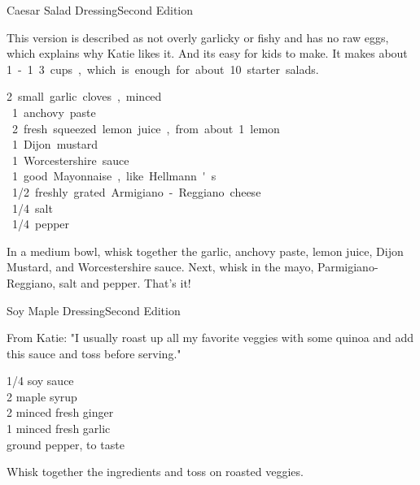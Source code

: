\begin{entry}{Caesar Salad Dressing}{Second Edition}

\begin{open}
  This version is described as not overly garlicky or fishy and has no raw eggs, which explains why Katie likes it. And its easy for kids to make. It makes about \SI{1}-\SI{1}{3} cups, which is enough for about 10 starter salads.
\end{open}
\begin{ingredients}
  \SI{2} small garlic cloves, minced \\
  \SI{1}{\teaspoon} anchovy paste \\
  \SI{2}{\tblspoon} fresh squeezed lemon juice, from about 1 lemon \\
  \SI{1}{\teaspoon} Dijon mustard \\
  \SI{1}{\teaspoon} Worcestershire sauce \\
  \SI{1}{\cup} good Mayonnaise, like Hellmann's \\
  \SI{1/2}{\cup} freshly grated Armigiano-Reggiano cheese \\
  \SI{1/4}{\teaspoon} salt \\
  \SI{1/4}{\teaspoon} pepper

\end{ingredients}

In a medium bowl, whisk together the garlic, anchovy paste, lemon juice, Dijon Mustard, and Worcestershire sauce. Next, whisk in the mayo, Parmigiano-Reggiano, salt and pepper. That's it!

\end{entry}

\begin{entry}{Soy Maple Dressing}{Second Edition}

\begin{open}
   From Katie: "I usually roast up all my favorite veggies with some quinoa and add this sauce and toss before serving."
\end{open}
\begin{ingredients}
  \SI{1/4}{\cup} soy sauce \\
  \SI{2}{\tblspoon} maple syrup \\
  \SI{2}{\teaspoon} minced fresh ginger \\
  \SI{1}{\teaspoon} minced fresh garlic \\
   ground pepper, to taste
\end{ingredients}

Whisk together the ingredients and toss on roasted veggies.

\end{entry}

